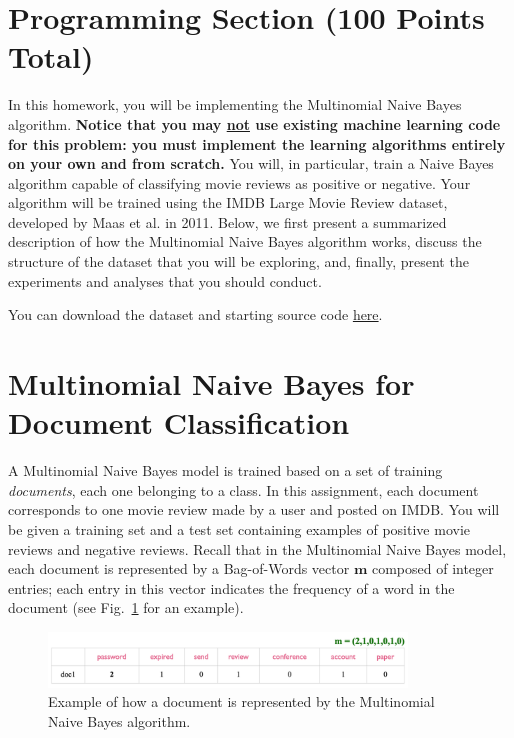 \documentclass[letterpaper]{article}
\begin{document}
\newpage

\vspace{1cm}
\section*{Programming Section (100 Points Total)}

In this homework, you will be implementing the Multinomial Naive Bayes algorithm. \textbf{Notice that you may \ul{not} use existing machine learning code for this problem: you must implement the learning algorithms entirely on your own and from scratch.} 
%
You will, in particular, train a Naive Bayes algorithm capable of classifying movie reviews as positive or negative. Your algorithm will be trained using the IMDB Large Movie Review dataset, developed by Maas et al. in 2011. Below, we first present a summarized description of how the Multinomial Naive Bayes algorithm works, discuss the structure of the dataset that you will be exploring, and, finally, present the experiments and analyses that you should conduct.

\noindent You can download the dataset and starting source code  \href{https://people.cs.umass.edu/~bsilva/courses/CMPSCI_589/Spring2022/homeworks/hw2.zip}{here}.

\section{Multinomial Naive Bayes for Document Classification}

A Multinomial Naive Bayes model is trained based on a set of training \textit{documents}, each one belonging to a class. In this assignment, each document corresponds to one movie review made by a user and posted on IMDB. You will be given a training set and a test set containing examples of positive movie reviews and negative reviews. Recall that in the Multinomial Naive Bayes model, each document is represented by a Bag-of-Words vector $\mathbf{m}$ composed of integer entries; each entry in this vector indicates the frequency of a word in the document (see Fig.~\ref{fig:multinomial_repr.png} for an example).

    \begin{figure}[h!!!]
        \centering
        \includegraphics[width=0.85\textwidth]{figures/multinomial_repr.png}
        \caption{Example of how a document is represented by the Multinomial Naive Bayes algorithm.}
        \label{fig:multinomial_repr.png}
    \end{figure}
\end{document}
